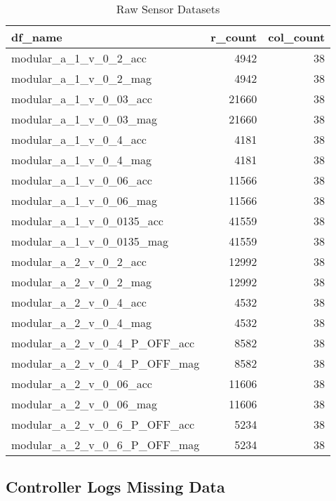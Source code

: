 \documentclass[]{article}
\begin{document}
\begin{table}[!h]

\caption{\label{tab:sensorfiledetails}Raw Sensor Datasets}
\centering
\begin{tabular}[t]{l|r|r}
\hline
df\_name & r\_count & col\_count\\
\hline
modular\_a\_1\_v\_0\_2\_acc & 4942 & 38\\
\hline
modular\_a\_1\_v\_0\_2\_mag & 4942 & 38\\
\hline
modular\_a\_1\_v\_0\_03\_acc & 21660 & 38\\
\hline
modular\_a\_1\_v\_0\_03\_mag & 21660 & 38\\
\hline
modular\_a\_1\_v\_0\_4\_acc & 4181 & 38\\
\hline
modular\_a\_1\_v\_0\_4\_mag & 4181 & 38\\
\hline
modular\_a\_1\_v\_0\_06\_acc & 11566 & 38\\
\hline
modular\_a\_1\_v\_0\_06\_mag & 11566 & 38\\
\hline
modular\_a\_1\_v\_0\_0135\_acc & 41559 & 38\\
\hline
modular\_a\_1\_v\_0\_0135\_mag & 41559 & 38\\
\hline
modular\_a\_2\_v\_0\_2\_acc & 12992 & 38\\
\hline
modular\_a\_2\_v\_0\_2\_mag & 12992 & 38\\
\hline
modular\_a\_2\_v\_0\_4\_acc & 4532 & 38\\
\hline
modular\_a\_2\_v\_0\_4\_mag & 4532 & 38\\
\hline
modular\_a\_2\_v\_0\_4\_P\_OFF\_acc & 8582 & 38\\
\hline
modular\_a\_2\_v\_0\_4\_P\_OFF\_mag & 8582 & 38\\
\hline
modular\_a\_2\_v\_0\_06\_acc & 11606 & 38\\
\hline
modular\_a\_2\_v\_0\_06\_mag & 11606 & 38\\
\hline
modular\_a\_2\_v\_0\_6\_P\_OFF\_acc & 5234 & 38\\
\hline
modular\_a\_2\_v\_0\_6\_P\_OFF\_mag & 5234 & 38\\
\hline
\end{tabular}
\end{table}

\newpage

\hypertarget{controller-logs-missing-data-1}{%
\subsection{Controller Logs Missing
Data}\label{controller-logs-missing-data-1}}
\end{document}
